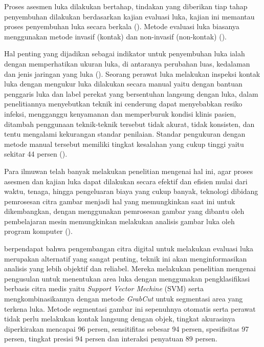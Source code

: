 Proses asesmen luka dilakukan bertahap, tindakan yang diberikan tiap tahap penyembuhan 
dilakukan berdasarkan kajian evaluasi luka, kajian ini memantau proses penyembuhan 
luka secara berkala (\cite{Silva:2021}). Metode evaluasi luka biasanya menggunakan 
metode invasif (kontak) dan non-invasif (non-kontak) (\cite{ManoharDhane:2017}).

Hal penting yang dijadikan sebagai indikator untuk penyembuhan luka ialah dengan 
memperhatikan ukuran luka, di antaranya perubahan luas, kedalaman dan jenis jaringan 
yang luka (\cite{Silva:2021}). Seorang perawat luka melakukan inspeksi kontak 
luka dengan mengukur luka dilakukan secara manual yaitu dengan bantuan penggaris 
luka dan label perekat yang bersentuhan langsung dengan luka, dalam penelitiannya 
\cite{Silva:2021} menyebutkan teknik ini cenderung dapat menyebabkan resiko infeksi, 
mengganggu kenyamanan dan memperburuk kondisi klinis pasien, ditambah penggunaan 
teknik-teknik tersebut tidak akurat, tidak konsisten, dan tentu mengalami kekurangan 
standar penilaian. Standar pengukuran dengan metode manual tersebut memiliki tingkat 
kesalahan yang cukup tinggi yaitu sekitar 44 persen  (\cite{Rizki:2022}).


Para ilmuwan telah banyak melakukan penelitian mengenai hal ini, agar proses asesmen 
dan kajian luka dapat dilakukan secara efektif dan efisien mulai dari waktu, tenaga, 
hingga pengeluaran biaya yang cukup banyak, teknologi dibidang pemrosesan citra gambar 
menjadi hal yang memungkinkan saat ini untuk dikembangkan, dengan menggunakan pemrosesan 
gambar yang dibantu oleh pembelajaran mesin memungkinkan melakukan analisis gambar 
luka oleh program komputer (\cite{Wang:2015}). 


\cite{Silva:2021} berpendapat bahwa pengembangan citra digital untuk melakukan 
evaluasi luka merupakan alternatif yang sangat penting, teknik ini akan menginformasikan 
analisis yang lebih objektif dan reliabel. Mereka melakukan penelitian mengenai 
pengusulan untuk menentukan area luka dengan menggunakan pengklasifikasi berbasis 
citra medis yaitu  \emph{Support Vector Mechine} (SVM) serta mengkombinasikannya dengan 
metode \emph{GrabCut} untuk segmentasi area yang terkena luka. Metode segmentasi gambar 
ini sepenuhnya otomatis serta perawat tidak perlu melakukan kontak langsung dengan 
objek, tingkat akurasinya diperkirakan mencapai 96 persen, sensitifitas sebesar 94 persen, 
spesifisitas 97 persen, tingkat presisi 94 persen dan interaksi penyatuan 89 persen.



